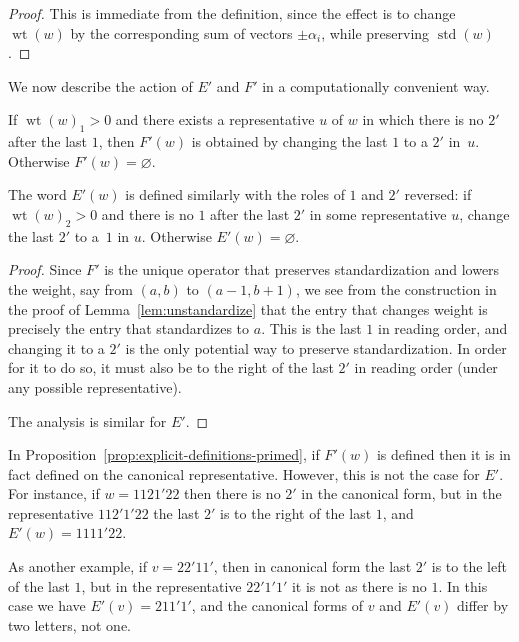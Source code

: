 \documentclass[ALCO,ThmDefs,Unicode,epreuves]{cedram}
\DeclareMathOperator{\std}{std}
\DeclareMathOperator{\wt}{wt}
\begin{document}
\begin{proof}
This is immediate from the definition, since the effect is to change $\wt (w)$ by the corresponding sum of vectors $\pm \alpha_i$, while preserving $\std (w)$.
\end{proof}


We now describe the action of $E'$ and $F'$ in a computationally convenient way.

\begin{prop}\label{prop:explicit-definitions-primed}
If $\wt(w)_1>0$ and there exists a representative $u$ of $w$ in which there is no $2'$ after the last $1$, then $F'(w)$ is obtained by changing the last $1$ to a $2'$ in~$u$. Otherwise $F'(w) = \varnothing$. 

The word $E'(w)$ is defined similarly with the roles of $1$ and $2'$ reversed: if $\wt(w)_2>0$ and there is no $1$ after the last $2'$ in some representative $u$, change the last $2'$ to a~$1$ in $u$. Otherwise $E'(w) = \varnothing$.
\end{prop}

\begin{proof}
Since $F'$ is the unique operator that preserves standardization and lowers the weight, say from $(a,b)$ to $(a-1,b+1)$, we see from the construction in the proof of Lemma~\ref{lem:unstandardize} that the entry that changes weight is precisely the entry that standardizes to $a$. This is the last $1$ in reading order, and changing it to a $2'$ is the only potential way to preserve standardization. In order for it to do so, it must also be to the right of the last $2'$ in reading order (under any possible representative).

The analysis is similar for $E'$.
\end{proof}

\begin{rema}
In Proposition~\ref{prop:explicit-definitions-primed}, if $F'(w)$ is defined then it is in fact defined on the canonical representative. However, this is not the case for $E'$. For instance, if $w=1121'22$ then there is no $2'$ in the canonical form, but in the representative $112'1'22$ the last $2'$ is to the right of the last $1$, and $E'(w)=1111'22$. 

As another example, if $v=22'11'$, then in canonical form the last $2'$ is to the left of the last $1$, but in the representative $22'1'1'$ it is not as there is no $1$. In this case we have $E'(v)=211'1'$, and the canonical forms of $v$ and $E'(v)$ differ by two letters, not one.
\end{rema}
\end{document}
